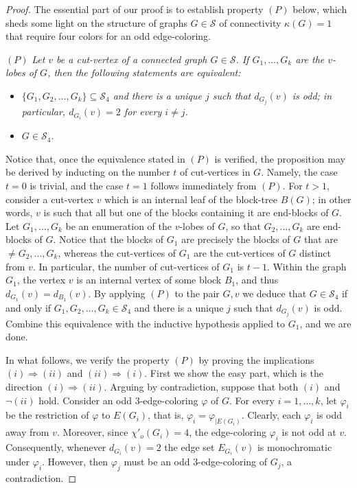 \documentclass[a4paper,12pt]{article}
\numberwithin{equation}{section}
\begin{document}
\begin{proof}
The essential part of our proof is to establish property $(P)$ below, which sheds some light on the structure of graphs $G\in\mathcal{S}$ of connectivity $\kappa(G)=1$ that require four colors for an odd edge-coloring.

\medskip

\noindent $(P)$ \textit{Let $v$ be a cut-vertex of a connected graph $G\in\mathcal{S}$. If $G_1,\ldots,G_k$ are the $v$-lobes of $G$, then the following statements are equivalent:}
\begin{itemize}
\item[$(i)$]  \textit{$\{G_1,G_2,\ldots,G_k\}\subseteq\mathcal{S}_4$  and there is a unique $j$ such that $d_{G_j}(v)$ is odd; in particular, $d_{G_i}(v)=2$ for every $i\neq j$.}
\item[$(ii)$] \textit{$G\in\mathcal{S}_4$.}
\end{itemize}


Notice that, once the equivalence stated in $(P)$ is verified, the proposition may be derived by inducting on the number $t$ of cut-vertices in $G$. Namely, the case $t=0$ is trivial, and the case $t=1$ follows immediately from $(P)$. For $t>1$, consider a cut-vertex $v$ which is an internal leaf of the block-tree $B(G)$; in other words, $v$ is such that all but one of the blocks containing it are end-blocks of $G$. Let $G_1,\ldots,G_k$ be an enumeration of the $v$-lobes of $G$, so that $G_2,\ldots,G_k$ are end-blocks of $G$. Notice that the blocks of $G_1$ are precisely the blocks of $G$ that are $\neq G_2,\ldots,G_k$, whereas the cut-vertices of $G_1$ are the cut-vertices of $G$ distinct from $v$. In particular, the number of cut-vertices of $G_1$ is $t-1$. Within the graph $G_1$, the vertex $v$ is an internal vertex of some block $B_1$, and thus $d_{G_1}(v)=d_{B_1}(v)$. By applying $(P)$ to the pair $G,v$ we deduce that $G\in\mathcal{S}_4$ if and only if  $G_1,G_2,\ldots,G_k\in\mathcal{S}_4$ and there is a unique $j$ such that $d_{G_j}(v)$ is odd. Combine this equivalence with the inductive hypothesis applied to $G_1$, and we are done.

\medskip

In what follows, we verify the property $(P)$ by proving the implications $(i)\Rightarrow(ii)$ and $(ii)\Rightarrow(i)$.
First we show the easy part, which is the direction $(i)\Rightarrow(ii)$. Arguing by contradiction, suppose that both $(i)$ and $\neg(ii)$  hold. Consider an odd $3$-edge-coloring $\varphi$ of $G$. For every $i=1,\ldots,k$, let $\varphi_i$ be the restriction of $\varphi$ to $E(G_i)$, that is, $\varphi_i=\varphi_{|E(G_i)}$. Clearly, each $\varphi_i$ is odd away from $v$. Moreover, since $\chi'_o(G_i)=4$, the edge-coloring $\varphi_i$  is not odd at $v$. Consequently, whenever $d_{G_i}(v)=2$ the edge set $E_{G_i}(v)$ is monochromatic under $\varphi_i$. However, then $\varphi_j$ must be an odd $3$-edge-coloring of $G_j$, a contradiction.


\end{proof}
\end{document}
